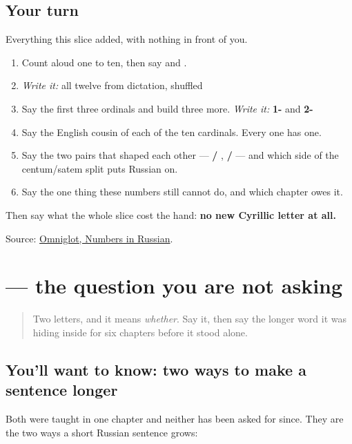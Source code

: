 \subsection*{Your turn}
Everything this slice added, with nothing in front of you.

\begin{enumerate}
\raggedright
  \item Count aloud one to ten, then say \textbf{} and \textbf{}.
  \item \emph{Write it:} all twelve from dictation, shuffled
  \item Say the first three ordinals and build three more. \emph{Write it:} \textbf{1-} and \textbf{2-}
  \item Say the English cousin of each of the ten cardinals. Every one has one.
  \item Say the two pairs that shaped each other — \textbf{ / }, \textbf{ / } — and which side of the centum/satem split \textbf{} puts Russian on.
  \item Say the one thing these numbers still cannot do, and which chapter owes it.
\end{enumerate}

Then say what the whole slice cost the hand: \textbf{no new Cyrillic letter at all.}

\begin{tcolorbox}[breakable,colback=teal!4,colframe=teal!35!black,title={Before you move on}]
Source: \href{https://www.omniglot.com/language/numbers/russian.htm}{Omniglot, Numbers in Russian}.
\end{tcolorbox}
\section[\texorpdfstring{\ru{ли} (li)}{ли (li)}]{ — the question you are not asking}

\label{lesson:RU-R26-second-pass-li-from-cold}



\begin{quote}
Two letters, and it means \emph{whether}. Say it, then say the longer word it was hiding inside for six chapters before it stood alone.
\end{quote}

\subsection*{You'll want to know: two ways to make a sentence longer}
Both were taught in one chapter and neither has been asked for since. They are the two ways a short Russian sentence grows:

